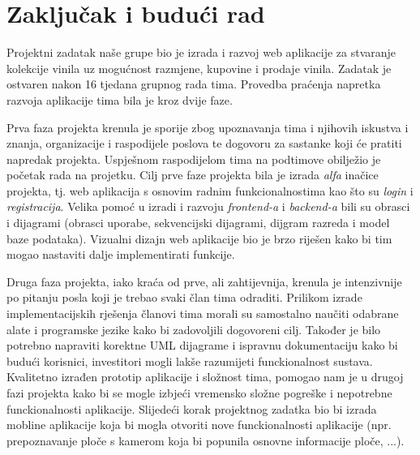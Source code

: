 \chapter{Zaključak i budući rad}
		
%		
%		

		Projektni zadatak naše grupe bio je izrada i razvoj web aplikacije za stvaranje kolekcije vinila uz mogućnost razmjene, kupovine i prodaje vinila. Zadatak je ostvaren nakon 16 tjedana grupnog rada tima. Provedba praćenja napretka razvoja aplikacije tima bila je kroz dvije faze.
		
		Prva faza projekta krenula je sporije zbog upoznavanja tima i njihovih iskustva i znanja, organizacije i raspodijele poslova te dogovoru za sastanke koji će pratiti napredak projekta. Uspješnom raspodijelom tima na podtimove obilježio je početak rada na projetku. Cilj prve faze projekta bila je izrada \textit{alfa} inačice projekta, tj. web aplikacija s osnovim radnim funkcionalnostima kao što su \textit{login} i \textit{registracija}. Velika pomoć u izradi i razvoju \textit{frontend-a} i \textit{backend-a} bili su obrasci i dijagrami (obrasci uporabe, sekvencijski dijagrami, dijgram razreda i model baze podataka). Vizualni dizajn web aplikacije bio je brzo riješen kako bi tim mogao nastaviti dalje implementirati funkcije.
		
		Druga faza projekta, iako kraća od prve, ali zahtijevnija, krenula je intenzivnije po pitanju posla koji je trebao svaki član tima odraditi. Prilikom izrade implementacijskih rješenja članovi tima morali su samostalno naučiti odabrane alate i programske jezike kako bi zadovoljili dogovoreni cilj. Također je bilo potrebno napraviti korektne UML dijagrame i ispravnu dokumentaciju kako bi budući korisnici, investitori mogli lakše razumijeti funckionalnost sustava. Kvalitetno izrađen prototip aplikacije i složnost tima, pomogao nam je u drugoj fazi projekta kako bi se mogle izbjeći vremensko složne pogreške i nepotrebne funckionalnosti aplikacije. Slijedeći korak projektnog zadatka bio bi izrada mobline aplikacije koja bi mogla otvoriti nove funckionalnosti aplikacije (npr. prepoznavanje ploče s kamerom koja bi popunila osnovne informacije ploče, ...).
		
